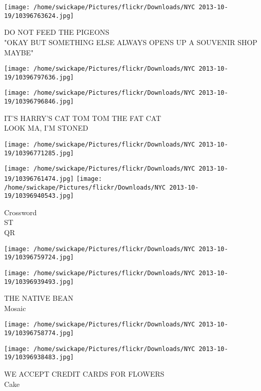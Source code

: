 \documentclass[10pt,letterpaper]{article}
\begin{document}
\vspace{0.25in}
\texttt{[image: /home/swickape/Pictures/flickr/Downloads/NYC 2013-10-19/10396763624.jpg]}

DO NOT FEED THE PIGEONS\\
"OKAY BUT SOMETHING ELSE ALWAYS OPENS UP A SOUVENIR SHOP MAYBE"\\
\pagebreak

\texttt{[image: /home/swickape/Pictures/flickr/Downloads/NYC 2013-10-19/10396797636.jpg]}

\vspace{0.25in}
\texttt{[image: /home/swickape/Pictures/flickr/Downloads/NYC 2013-10-19/10396796846.jpg]}

IT'S HARRY'S CAT TOM TOM THE FAT CAT\\
LOOK MA, I'M STONED\\
\pagebreak

\texttt{[image: /home/swickape/Pictures/flickr/Downloads/NYC 2013-10-19/10396771285.jpg]}

\vspace{0.25in}
\texttt{[image: /home/swickape/Pictures/flickr/Downloads/NYC 2013-10-19/10396761474.jpg]}
\texttt{[image: /home/swickape/Pictures/flickr/Downloads/NYC 2013-10-19/10396940543.jpg]}

Crossword\\
ST\\
QR\\
\pagebreak

\texttt{[image: /home/swickape/Pictures/flickr/Downloads/NYC 2013-10-19/10396759724.jpg]}

\vspace{0.25in}
\texttt{[image: /home/swickape/Pictures/flickr/Downloads/NYC 2013-10-19/10396939493.jpg]}

THE NATIVE BEAN\\
Mosaic\\
\pagebreak

\texttt{[image: /home/swickape/Pictures/flickr/Downloads/NYC 2013-10-19/10396758774.jpg]}

\vspace{0.25in}
\texttt{[image: /home/swickape/Pictures/flickr/Downloads/NYC 2013-10-19/10396938483.jpg]}

WE ACCEPT CREDIT CARDS FOR FLOWERS\\
Cake\\
\pagebreak
\end{document}
